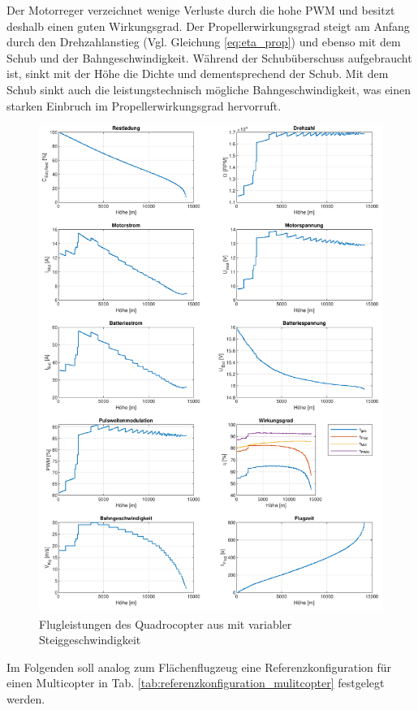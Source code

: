 Der Motorreger verzeichnet wenige Verluste durch die hohe PWM und besitzt deshalb einen guten Wirkungsgrad. Der Propellerwirkungsgrad steigt am Anfang durch den Drehzahlanstieg (Vgl. Gleichung \ref{eq:eta_prop}) und ebenso mit dem Schub und der Bahngeschwindigkeit. Während der Schubüberschuss aufgebraucht ist, sinkt mit der Höhe die Dichte und dementsprechend der Schub. Mit dem Schub sinkt auch die leistungstechnisch mögliche Bahngeschwindigkeit, was einen starken Einbruch im Propellerwirkungsgrad hervorruft.

\begin{figure}[H]
\centering
	\includegraphics[scale=0.7]{Diagramme/Russland_vvar.pdf}
	\caption{Flugleistungen des Quadrocopter aus \cite{Anderson.2018} mit variabler Steiggeschwindigkeit}
	\label{abb:fp}
\end{figure}

Im Folgenden soll analog zum Flächenflugzeug eine Referenzkonfiguration für einen Multicopter in Tab. \ref{tab:referenzkonfiguration_mulitcopter} festgelegt werden.

